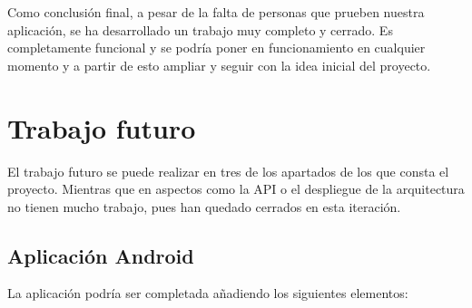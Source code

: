 \documentclass[11pt,spanish]{article}
\begin{document}
Como conclusión final, a pesar de la falta de personas que prueben nuestra aplicación, se ha desarrollado un trabajo muy completo y cerrado. Es completamente funcional y se podría poner en funcionamiento en cualquier momento y a partir de esto ampliar y seguir con la idea inicial del proyecto.
\newpage

\section{Trabajo futuro}
El trabajo futuro se puede realizar en tres de los apartados de los que consta el proyecto. Mientras que en aspectos como la API o el despliegue de la arquitectura no tienen mucho trabajo, pues han quedado cerrados en esta iteración.

\subsection{Aplicación Android}
La aplicación podría ser completada añadiendo los siguientes elementos:
\end{document}

